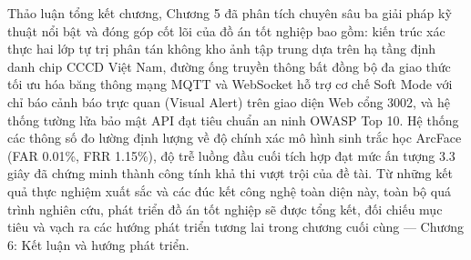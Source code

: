 ﻿\documentclass[../DoAn.tex]{subfiles}
\begin{document}
\clearpage

Thảo luận tổng kết chương, Chương 5 đã phân tích chuyên sâu ba giải pháp kỹ thuật nổi bật và đóng góp cốt lõi của đồ án tốt nghiệp bao gồm: kiến trúc xác thực hai lớp tự trị phân tán không kho ảnh tập trung dựa trên hạ tầng định danh chip CCCD Việt Nam, đường ống truyền thông bất đồng bộ đa giao thức tối ưu hóa băng thông mạng MQTT và WebSocket hỗ trợ cơ chế Soft Mode với chỉ báo cảnh báo trực quan (Visual Alert) trên giao diện Web cổng 3002, và hệ thống tường lửa bảo mật API đạt tiêu chuẩn an ninh OWASP Top 10. Hệ thống các thông số đo lường định lượng về độ chính xác mô hình sinh trắc học ArcFace (FAR 0.01\%, FRR 1.15\%), độ trễ luồng đầu cuối tích hợp đạt mức ấn tượng 3.3 giây đã chứng minh thành công tính khả thi vượt trội của đề tài. Từ những kết quả thực nghiệm xuất sắc và các đúc kết công nghệ toàn diện này, toàn bộ quá trình nghiên cứu, phát triển đồ án tốt nghiệp sẽ được tổng kết, đối chiếu mục tiêu và vạch ra các hướng phát triển tương lai trong chương cuối cùng — Chương 6: Kết luận và hướng phát triển.
\end{document}
